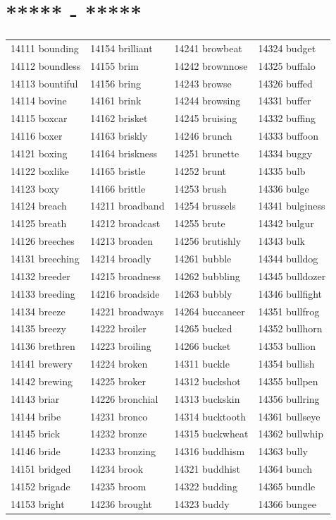 \documentclass[10pt, oneside]{book}
\begin{document}
\begin{table}
	\centering
	\section*{***** - *****}
	\begin{tabular}{l l l l}
14111 bounding &14154 brilliant &14241 browbeat &14324 budget\\
14112 boundless &14155 brim &14242 brownnose &14325 buffalo\\
14113 bountiful &14156 bring &14243 browse &14326 buffed\\
14114 bovine &14161 brink &14244 browsing &14331 buffer\\
14115 boxcar &14162 brisket &14245 bruising &14332 buffing\\
14116 boxer &14163 briskly &14246 brunch &14333 buffoon\\
14121 boxing &14164 briskness &14251 brunette &14334 buggy\\
14122 boxlike &14165 bristle &14252 brunt &14335 bulb\\
14123 boxy &14166 brittle &14253 brush &14336 bulge\\
14124 breach &14211 broadband &14254 brussels &14341 bulginess\\
14125 breath &14212 broadcast &14255 brute &14342 bulgur\\
14126 breeches &14213 broaden &14256 brutishly &14343 bulk\\
14131 breeching &14214 broadly &14261 bubble &14344 bulldog\\
14132 breeder &14215 broadness &14262 bubbling &14345 bulldozer\\
14133 breeding &14216 broadside &14263 bubbly &14346 bullfight\\
14134 breeze &14221 broadways &14264 buccaneer &14351 bullfrog\\
14135 breezy &14222 broiler &14265 bucked &14352 bullhorn\\
14136 brethren &14223 broiling &14266 bucket &14353 bullion\\
14141 brewery &14224 broken &14311 buckle &14354 bullish\\
14142 brewing &14225 broker &14312 buckshot &14355 bullpen\\
14143 briar &14226 bronchial &14313 buckskin &14356 bullring\\
14144 bribe &14231 bronco &14314 bucktooth &14361 bullseye\\
14145 brick &14232 bronze &14315 buckwheat &14362 bullwhip\\
14146 bride &14233 bronzing &14316 buddhism &14363 bully\\
14151 bridged &14234 brook &14321 buddhist &14364 bunch\\
14152 brigade &14235 broom &14322 budding &14365 bundle\\
14153 bright &14236 brought &14323 buddy &14366 bungee\\
	\end{tabular}
 \end{table}
\end{document}

